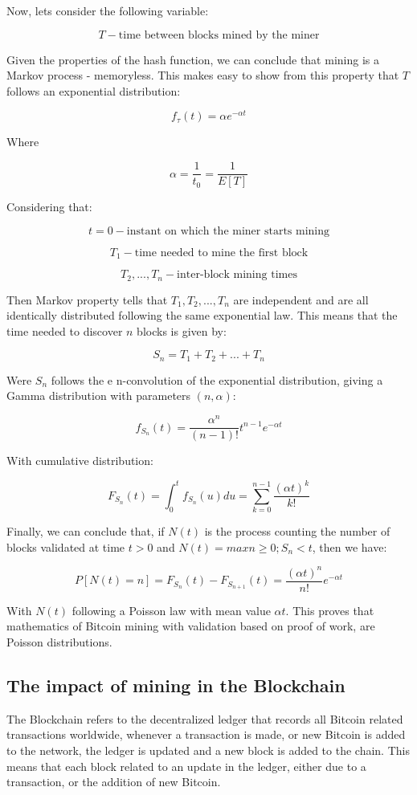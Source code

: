 \documentclass{article}
\newcommand\tab[1][1cm]{\hspace*{#1}}
\begin{document}
Now, lets consider the following variable:

\[T - \mbox{time between blocks mined by the miner}\]

Given the properties of the hash function, we can conclude that mining is a Markov process - memoryless. This makes easy to show from this property that \(T\) follows an exponential distribution:

\[f_\tau(t) = \alpha e^{-\alpha t}\]

Where

\[\alpha = \frac{1}{t_0} = \frac{1}{E[T]}\]

Considering that:

\[t = 0 - \mbox{instant on which the miner starts mining}\]

\[T_1 - \mbox{time needed to mine the first block}\]

\[T_2,...,T_n - \mbox{inter-block mining times}\]

Then Markov property tells that \(T_1,T_2,...,T_n\) are independent and are all identically distributed following the same exponential law. This means that the time needed to discover \(n\) blocks is given by:

\[S_n = T_1 + T_2 + ... + T_n\]

Were \(S_n\) follows the e n-convolution of the exponential distribution, giving a Gamma
distribution with parameters \((n,\alpha)\):

\[f_{S_n}(t) = \frac{\alpha^n}{(n-1)!}t^{n-1}e^{-\alpha t}\]

With cumulative distribution:

\[F_{S_n}(t) = \int_{0}^{t} f_{S_n}(u)du = \sum_{k=0}^{n-1} \frac{(\alpha t)^k}{k!}\]

Finally, we can conclude that, if \(N(t)\) is the process counting the number of blocks validated at time \(t > 0\) and \(N(t) = max{n \geq 0; S_n < t}\), then we have:

\[P[N(t) = n] = F_{S_n}(t) - F_{S_{n+1}}(t) = \frac{(\alpha t)^n}{n!}e^{-\alpha t}\]

With \(N(t)\) following a Poisson law with mean value \(\alpha t\). This proves that mathematics of Bitcoin mining with validation based on proof of work, are Poisson distributions.

\subsection{The impact of mining in the Blockchain}

\tab The Blockchain refers to the decentralized ledger that records all Bitcoin related transactions worldwide, whenever a transaction is made, or new Bitcoin is added to the network, the ledger is updated and a new block is added to the chain. This means that each block related to an update in the ledger, either due to a transaction, or the addition of new Bitcoin.
\end{document}
